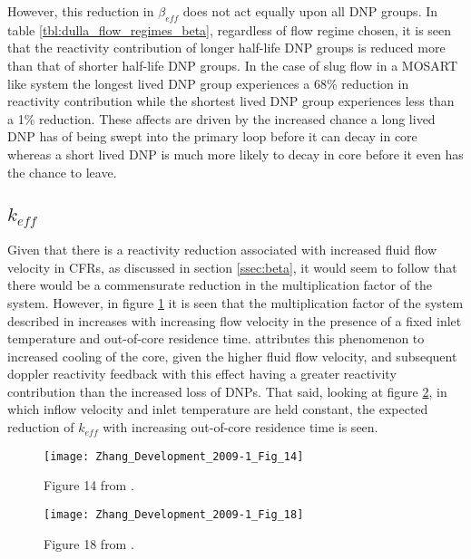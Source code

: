 \documentclass[review]{elsarticle}
\begin{document}
However,
this reduction in $\beta_{eff}$ does not act equally upon all DNP groups. In table
\ref{tbl:dulla_flow_regimes_beta}, regardless of flow regime chosen, it is seen
that the reactivity contribution of longer half-life DNP groups is
reduced more than that of shorter half-life DNP groups. In the case of slug
flow in a MOSART like system the longest lived DNP group experiences a 68\%
reduction in reactivity contribution while the shortest lived DNP group
experiences less than a 1\% reduction. These affects are driven by the increased
chance a long lived DNP has of being swept into the primary loop before it can
decay in core whereas a short lived DNP is much more likely to decay in core
before it even has the chance to leave.

\subsection{$k_{eff}$} \label{ssec:keff}
Given that there is a reactivity reduction associated with increased fluid flow
velocity in CFRs, as discussed in section \ref{ssec:beta}, it would seem to follow
that there would be a commensurate reduction in the multiplication factor of
the system. However, in figure \ref{fig:zhang_velocity_keff} it is seen that the
multiplication factor of the system described in \cite{zhang_development_2009-1}
increases with increasing flow velocity in the presence of a fixed inlet temperature and out-of-core
residence time. \cite{zhang_development_2009-1} attributes
this phenomenon to increased cooling of the core, given the higher fluid flow 
velocity, and subsequent doppler reactivity feedback with this effect
having a greater reactivity contribution than the increased loss of DNPs. That
said, looking at figure \ref{fig:zhang_residence_time_keff}, in which inflow
 velocity and inlet temperature are held constant, the expected reduction of
 $k_{eff}$ with increasing out-of-core residence time is seen.


\begin{figure}[h]
   \centering
   \texttt{[image: Zhang\_Development\_2009-1\_Fig\_14]}
   \caption{Figure 14 from \cite{zhang_development_2009-1}.}
   \label{fig:zhang_velocity_keff}
\end{figure}

\begin{figure}[h]
   \centering
   \texttt{[image: Zhang\_Development\_2009-1\_Fig\_18]}
   \caption{Figure 18 from \cite{zhang_development_2009-1}.} 
   \label{fig:zhang_residence_time_keff}
\end{figure}
\end{document}
